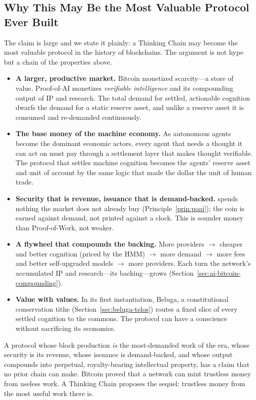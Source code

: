 \subsection{Why This May Be the Most Valuable Protocol Ever Built}
\label{sec:ai-bitcoin-claim}

The claim is large and we state it plainly: a Thinking Chain may become the most valuable protocol in the history of blockchains. The argument is not hype but a chain of the properties above.

\begin{itemize}[leftmargin=1.4em]
\item \textbf{A larger, productive market.} Bitcoin monetized scarcity---a store of value. Proof-of-AI monetizes \emph{verifiable intelligence} and its compounding output of IP and research. The total demand for settled, actionable cognition dwarfs the demand for a static reserve asset, and unlike a reserve asset it is consumed and re-demanded continuously.
\item \textbf{The base money of the machine economy.} As autonomous agents become the dominant economic actors, every agent that needs a thought it can act on must pay through a settlement layer that makes thought verifiable. The protocol that settles machine cognition becomes the agents' reserve asset and unit of account by the same logic that made the dollar the unit of human trade.
\item \textbf{Security that is revenue, issuance that is demand-backed.} \PoAI{} spends nothing the market does not already buy (Principle~\ref{prin:poai}); the coin is earned against demand, not printed against a clock. This is sounder money than Proof-of-Work, not weaker.
\item \textbf{A flywheel that compounds the backing.} More providers $\rightarrow$ cheaper and better cognition (priced by the HMM) $\rightarrow$ more demand $\rightarrow$ more fees and better self-upgraded models $\rightarrow$ more providers. Each turn the network's accumulated IP and research---its backing---grows (Section~\ref{sec:ai-bitcoin-compounding}).
\item \textbf{Value with values.} In its first instantiation, Beluga, a constitutional conservation tithe (Section~\ref{sec:beluga-telos}) routes a fixed slice of every settled cognition to the commons. The protocol can have a conscience without sacrificing its economics.
\end{itemize}

A protocol whose block production \emph{is} the most-demanded work of the era, whose security is its revenue, whose issuance is demand-backed, and whose output compounds into perpetual, royalty-bearing intellectual property, has a claim that no prior chain can make. Bitcoin proved that a network can mint trustless money from useless work. A Thinking Chain proposes the sequel: trustless money from the most useful work there is.

